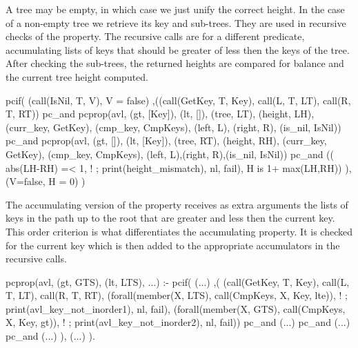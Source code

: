 \documentclass[11pt]{article}
\begin{document}
A tree may be empty, in which case we just unify the correct height.
%
In the case of a non-empty tree we retrieve its key and sub-trees.
%
They are used in recursive checks of the property.
%
The recursive calls are for a different predicate, accumulating lists of
keys that should be greater of less then the keys of the tree.
%
After checking the sub-trees, the returned heights are compared for
balance and the current tree height computed.
%
\begin{yapcode}
   pcif( (call(IsNil, T, V), V = false)
   ,((call(GetKey, T, Key),
       call(L, T, LT),  call(R, T, RT))
   pc_and
     pcprop({avl, (gt, [Key]), (lt, []),
 (tree, LT), (height, LH),
 (curr_key, GetKey), (cmp_key, CmpKeys),
 (left, L), (right, R), (is_nil, IsNil)})
   pc_and
     pcprop({avl, (gt, []), (lt, [Key]),
 (tree, RT), (height, RH),
 (curr_key, GetKey), (cmp_key, CmpKeys),
 (left, L),(right, R),(is_nil, IsNil)})
   pc_and
     (( abs(LH-RH) =< 1, !
     ; print(height_mismatch), nl, fail),
     H is 1+ max(LH,RH))
   ),
   (V=false, H = 0) )
\end{yapcode}
%


The accumulating version of the property receives as extra arguments the
lists of keys in the path up to the root that are greater and less then
the current key.
%
This order criterion is what differentiates the accumulating property.
%
It is checked for the current key which is then added to the appropriate
accumulators in the recursive calls.
\begin{yapcode}
 pcprop({avl, (gt, GTS), (lt, LTS), ...}) :-
   pcif(
     (...)
   ,(
     (call(GetKey, T, Key), call(L, T, LT),
      call(R, T, RT),
      (forall(member(X, LTS),
       call(CmpKeys, X, Key, lte)), !
      ; print(avl_key_not_inorder1), nl, fail),
      (forall(member(X, GTS),
       call(CmpKeys, X, Key, gt)), !
      ; print(avl_key_not_inorder2), nl, fail))
   pc_and (...)
   pc_and (...)
   pc_and (...)
   ),
     (...)
   ).
\end{yapcode}
\end{document}
